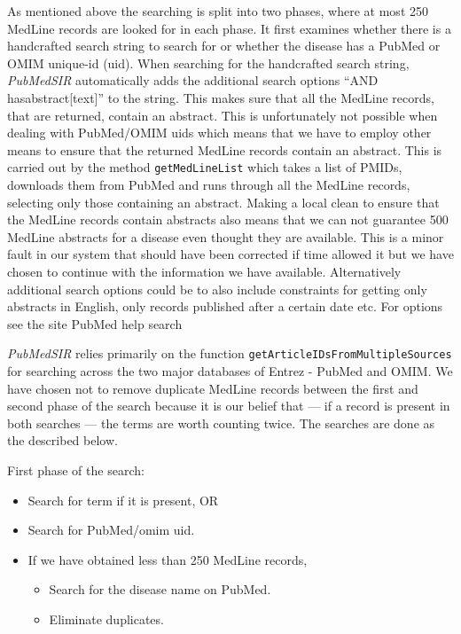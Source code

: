 As mentioned above the searching is split into two phases, where at
 most 250 MedLine records are looked for in each phase. It first examines
whether there is a handcrafted search string to search for or whether
the disease has a PubMed or OMIM unique-id (uid). When searching for
the handcrafted search string, \textit{PubMedSIR} automatically adds the
additional search options ``AND hasabstract[text]'' to the string. This
makes sure that all the MedLine records, that are returned, contain
an abstract. This is unfortunately not possible when dealing with
PubMed/OMIM uids which means that we have to employ other means to
ensure that the returned MedLine records contain an abstract. This is
carried out by the method \texttt{getMedLineList} which takes a list of
PMIDs, downloads them from PubMed and runs through all the MedLine
records, selecting only those containing an abstract. Making a local
clean to ensure that the MedLine records contain abstracts also
means that we can not guarantee 500 MedLine abstracts for a disease
even thought they are available. This is a minor fault in our system
that should have been corrected if time allowed it but we have chosen
to continue with the information we have available. Alternatively
additional search options could be to also include constraints for
getting only abstracts in English, only records published after a
certain date etc. For options see the site PubMed help search
\cite{PubMedHelpSearch}

\textit{PubMedSIR} relies primarily on the function
\texttt{getArticleIDsFromMultipleSources} for searching across the two
major databases of Entrez - PubMed and OMIM. We have chosen not to
remove duplicate MedLine records between the first and second phase of
the search because it is our belief that --- if a record is present in
both searches --- the terms are worth counting twice. The searches are
done as the described below.

First phase of the search:
\begin{itemize}

\item Search for term if it is present, OR

\item Search for PubMed/omim uid.

\item If we have obtained less than 250 MedLine records,
  
\begin{itemize}

  \item Search for the disease name on PubMed.

  \item Eliminate duplicates.

  \end{itemize}
\end{itemize}


